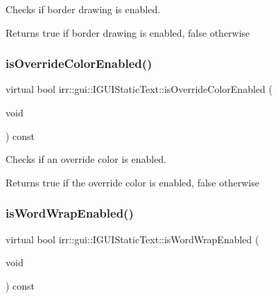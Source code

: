 Checks if border drawing is enabled. 

\begin{DoxyReturn}{Returns}
true if border drawing is enabled, false otherwise 
\end{DoxyReturn}
\mbox{\label{classirr_1_1gui_1_1IGUIStaticText_a67b17803b8ad73e8d687b23ad38db37e}} 
\subsubsection{\texorpdfstring{is\+Override\+Color\+Enabled()}{isOverrideColorEnabled()}}
{\footnotesize\ttfamily virtual bool irr\+::gui\+::\+I\+G\+U\+I\+Static\+Text\+::is\+Override\+Color\+Enabled (\begin{DoxyParamCaption}\item[{void}]{ }\end{DoxyParamCaption}) const\hspace{0.3cm}{\ttfamily [pure virtual]}}



Checks if an override color is enabled. 

\begin{DoxyReturn}{Returns}
true if the override color is enabled, false otherwise 
\end{DoxyReturn}
\mbox{\label{classirr_1_1gui_1_1IGUIStaticText_a42d7fbdb196414a1d95146b53e6a3528}} 
\subsubsection{\texorpdfstring{is\+Word\+Wrap\+Enabled()}{isWordWrapEnabled()}}
{\footnotesize\ttfamily virtual bool irr\+::gui\+::\+I\+G\+U\+I\+Static\+Text\+::is\+Word\+Wrap\+Enabled (\begin{DoxyParamCaption}\item[{void}]{ }\end{DoxyParamCaption}) const\hspace{0.3cm}{\ttfamily [pure virtual]}}




